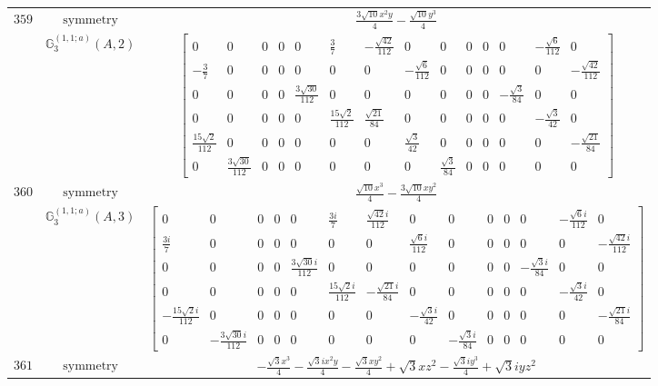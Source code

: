 \documentclass[fleqn,8pt,landscape]{jsarticle}
\begin{document}
\begin{longtable}{ccc}
$ 359 $ & $ \text{symmetry} $ & $ \frac{3 \sqrt{10} x^{2} y}{4} - \frac{\sqrt{10} y^{3}}{4} $ \\
$  $ & $ \mathbb{G}_{3}^{(1,1;a)}(A,2) $ & $ \begin{bmatrix} 0 & 0 & 0 & 0 & 0 & \frac{3}{7} & - \frac{\sqrt{42}}{112} & 0 & 0 & 0 & 0 & 0 & - \frac{\sqrt{6}}{112} & 0 \\ - \frac{3}{7} & 0 & 0 & 0 & 0 & 0 & 0 & - \frac{\sqrt{6}}{112} & 0 & 0 & 0 & 0 & 0 & - \frac{\sqrt{42}}{112} \\ 0 & 0 & 0 & 0 & \frac{3 \sqrt{30}}{112} & 0 & 0 & 0 & 0 & 0 & 0 & - \frac{\sqrt{3}}{84} & 0 & 0 \\ 0 & 0 & 0 & 0 & 0 & \frac{15 \sqrt{2}}{112} & \frac{\sqrt{21}}{84} & 0 & 0 & 0 & 0 & 0 & - \frac{\sqrt{3}}{42} & 0 \\ \frac{15 \sqrt{2}}{112} & 0 & 0 & 0 & 0 & 0 & 0 & \frac{\sqrt{3}}{42} & 0 & 0 & 0 & 0 & 0 & - \frac{\sqrt{21}}{84} \\ 0 & \frac{3 \sqrt{30}}{112} & 0 & 0 & 0 & 0 & 0 & 0 & \frac{\sqrt{3}}{84} & 0 & 0 & 0 & 0 & 0 \end{bmatrix} $ \\ \hline
$ 360 $ & $ \text{symmetry} $ & $ \frac{\sqrt{10} x^{3}}{4} - \frac{3 \sqrt{10} x y^{2}}{4} $ \\
$  $ & $ \mathbb{G}_{3}^{(1,1;a)}(A,3) $ & $ \begin{bmatrix} 0 & 0 & 0 & 0 & 0 & \frac{3 i}{7} & \frac{\sqrt{42} i}{112} & 0 & 0 & 0 & 0 & 0 & - \frac{\sqrt{6} i}{112} & 0 \\ \frac{3 i}{7} & 0 & 0 & 0 & 0 & 0 & 0 & \frac{\sqrt{6} i}{112} & 0 & 0 & 0 & 0 & 0 & - \frac{\sqrt{42} i}{112} \\ 0 & 0 & 0 & 0 & \frac{3 \sqrt{30} i}{112} & 0 & 0 & 0 & 0 & 0 & 0 & - \frac{\sqrt{3} i}{84} & 0 & 0 \\ 0 & 0 & 0 & 0 & 0 & \frac{15 \sqrt{2} i}{112} & - \frac{\sqrt{21} i}{84} & 0 & 0 & 0 & 0 & 0 & - \frac{\sqrt{3} i}{42} & 0 \\ - \frac{15 \sqrt{2} i}{112} & 0 & 0 & 0 & 0 & 0 & 0 & - \frac{\sqrt{3} i}{42} & 0 & 0 & 0 & 0 & 0 & - \frac{\sqrt{21} i}{84} \\ 0 & - \frac{3 \sqrt{30} i}{112} & 0 & 0 & 0 & 0 & 0 & 0 & - \frac{\sqrt{3} i}{84} & 0 & 0 & 0 & 0 & 0 \end{bmatrix} $ \\ \hline
$ 361 $ & $ \text{symmetry} $ & $ - \frac{\sqrt{3} x^{3}}{4} - \frac{\sqrt{3} i x^{2} y}{4} - \frac{\sqrt{3} x y^{2}}{4} + \sqrt{3} x z^{2} - \frac{\sqrt{3} i y^{3}}{4} + \sqrt{3} i y z^{2} $ \\

\end{longtable}
\end{document}
